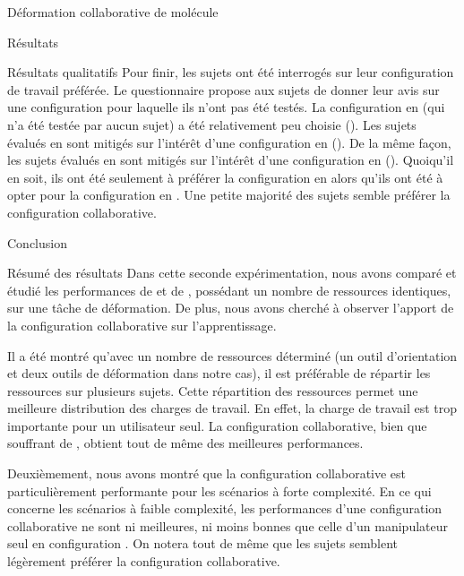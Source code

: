 \documentclass[myfrancais,ngerman,english,frenchb]{mythesis}
\begin{document}
\begin{mychapter}{Déformation collaborative de molécule}
\begin{mysection}{Résultats}
\begin{mysubsection}{Résultats qualitatifs}
				Pour finir, les sujets ont été interrogés sur leur configuration de travail préférée.
				Le questionnaire propose aux sujets de donner leur avis sur une configuration pour laquelle ils n'ont pas été testés.
				La configuration  en  (qui n'a été testée par aucun sujet) a été relativement peu choisie ().
				Les sujets évalués en  sont mitigés sur l'intérêt d'une configuration  en  ().
				De la même façon, les sujets évalués en  sont mitigés sur l'intérêt d'une configuration  en  ().
				Quoiqu'il en soit, ils ont été seulement  à préférer la configuration  en  alors qu'ils ont été  à opter pour la configuration  en .
				Une petite majorité des sujets semble préférer la configuration collaborative.
			\end{mysubsection}
		\end{mysection}
		\begin{mysection}{Conclusion}
			\begin{mysubsection}{Résumé des résultats}
				Dans cette seconde expérimentation, nous avons comparé et étudié les performances de  et de , possédant un nombre de ressources identiques, sur une tâche de déformation.
				De plus, nous avons cherché à observer l'apport de la configuration collaborative sur l'apprentissage.

				Il a été montré qu'avec un nombre de ressources déterminé (un outil d'orientation et deux outils de déformation dans notre cas), il est préférable de répartir les ressources sur plusieurs sujets.
				Cette répartition des ressources permet une meilleure distribution des charges de travail.
				En effet, la charge de travail est trop importante pour un utilisateur seul.
				La configuration collaborative, bien que souffrant de , obtient tout de même des meilleures performances.

				Deuxièmement, nous avons montré que la configuration collaborative est particulièrement performante pour les scénarios à forte complexité.
				En ce qui concerne les scénarios à faible complexité, les performances d'une configuration collaborative ne sont ni meilleures, ni moins bonnes que celle d'un manipulateur seul en configuration .
				On notera tout de même que les sujets semblent légèrement préférer la configuration collaborative.


\end{mysubsection}
\end{mysection}
\end{mychapter}
\end{document}

